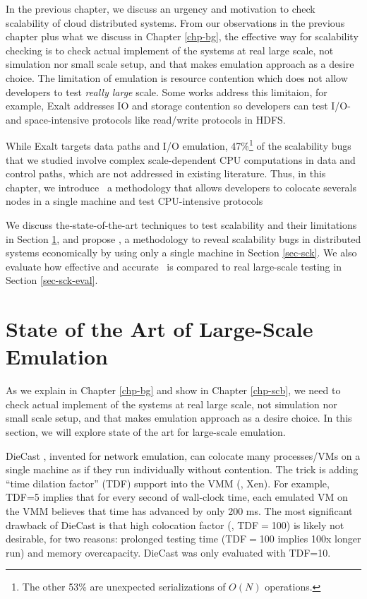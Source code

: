 
In the previous chapter, we discuss an urgency and motivation to check
scalability of cloud distributed systems. From our observations in the previous
chapter plus what we discuss in Chapter \ref{chp-bg}, the effective way for
scalability checking is to check actual implement of the systems at real large
scale, not simulation nor small scale setup, and that makes emulation approach
as a desire choice. The limitation of emulation is resource contention which
does not allow developers to test \textit{really large} scale. Some works
address this limitaion, for example, Exalt \cite{exalt} addresses IO and storage
contention so developers can test I/O- and space-intensive protocols like
read/write protocols in HDFS.

While Exalt targets data paths and I/O emulation, 47\%\footnote{The other 53\%
are unexpected serializations of $O(N)$ operations.} of the scalability bugs
that we studied involve complex scale-dependent CPU computations in data and
control paths, which are not addressed in existing literature. Thus, in this
chapter, we introduce \sck\, a methodology that allows developers to colocate
severals nodes in a single machine and test CPU-intensive protocols


We discuss the-state-of-the-art techniques to test scalability
and their limitations in Section \ref{mot-state}, and propose \sck, a
methodology to reveal scalability bugs in distributed systems economically by
using only a single machine in Section \ref{sec-sck}. We also evaluate how
effective and accurate \sck\ is compared to real large-scale testing in Section
\ref{sec-sck-eval}.

\section{State of the Art of Large-Scale Emulation}
\label{mot-state}

As we explain in Chapter \ref{chp-bg} and show in Chapter \ref{chp-scb}, we need
to check actual implement of the systems at real large scale, not simulation nor
small scale setup, and that makes emulation approach as a desire choice. In this
section, we will explore state of the art for large-scale emulation.

%
DieCast \cite{Gupta+08-DieCast}, invented for network emulation, can colocate
many processes/VMs on a single machine as if they run individually without
contention.  The trick is adding ``time dilation factor'' (TDF) support
\cite{Gupta+06-TimeDilation} into the VMM (\eg, Xen).
%
For example, TDF=5 implies that for every second of wall-clock time, each
emulated VM on the VMM believes that time has advanced by only 200 ms.
%
The most significant drawback of DieCast is that high colocation factor (\eg,
TDF$=$100) is likely not desirable, for two reasons: prolonged testing time
(TDF$=$100 implies 100x longer run) and memory overcapacity.  DieCast was only
evaluated with TDF=10.



